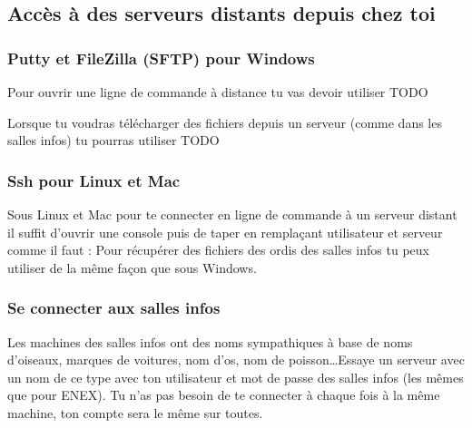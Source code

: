 \subsection{Acc\`es \`a des serveurs distants depuis chez toi}

\subsubsection{Putty et FileZilla (SFTP) pour Windows}

Pour ouvrir une ligne de commande à distance tu vas devoir utiliser  TODO

Lorsque tu voudras télécharger des fichiers depuis un serveur (comme dans les salles infos) tu pourras utiliser  TODO

\subsubsection{Ssh pour Linux et Mac}

Sous Linux et Mac pour te connecter en ligne de commande à un serveur distant il suffit d'ouvrir une console puis de taper en remplaçant utilisateur et serveur comme il faut :  Pour récupérer des fichiers des ordis des salles infos tu peux utiliser  de la même façon que sous Windows.

\subsubsection{Se connecter aux salles infos}

Les machines des salles infos ont des noms sympathiques à base de noms d'oiseaux, marques de voitures, nom d'os, nom de poisson\dots Essaye un serveur avec un nom de ce type avec ton utilisateur et mot de passe des salles infos (les mêmes que pour ENEX). Tu n'as pas besoin de te connecter à chaque fois à la même machine, ton compte sera le même sur toutes. 

